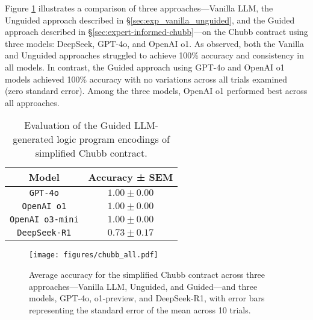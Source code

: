 Figure \ref{fig:vanilla_unguided_guided_chubb_comparisons} illustrates a comparison of three approaches—Vanilla LLM, the Unguided approach described in \S\ref{sec:exp_vanilla_unguided}, and the Guided approach described in \S\ref{sec:expert-informed-chubb}—on the Chubb contract using three models: DeepSeek, GPT-4o, and OpenAI o1. As observed, both the Vanilla and Unguided approaches struggled to achieve 100\% accuracy and consistency in all models. In contrast, the Guided approach using GPT-4o and OpenAI o1 models achieved 100\% accuracy with no variations across all trials examined (zero standard error). Among the three models, OpenAI o1 performed best across all approaches.
%
\begin{table}
  \centering
  \begin{tabular}{|c|c|}
    \hline
    Model & Accuracy ± SEM \\
    \hline
    \verb|GPT-4o|     & $1.00 \pm  0.00$         \\ \hline
    \verb|OpenAI o1|     & $1.00 \pm  0.00$          \\ \hline
    \verb|OpenAI o3-mini|     & $1.00 \pm  0.00$          \\ \hline
    \verb|DeepSeek-R1|     & $0.73 \pm  0.17$                   \\\hline
  \end{tabular}
  \caption{Evaluation of the Guided LLM-generated logic program encodings of simplified Chubb contract.}
  \label{tab:chubb-simplified}
\end{table}
%
\begin{figure}[ht]
    \centering
   \texttt{[image: figures/chubb\_all.pdf]}
   \caption{Average accuracy for the simplified Chubb contract across three approaches—Vanilla LLM, Unguided, and Guided—and three models, GPT-4o, o1-preview, and DeepSeek-R1, with error bars representing the standard error of the mean across 10 trials.}
\label{fig:vanilla_unguided_guided_chubb_comparisons}
\end{figure}
%

